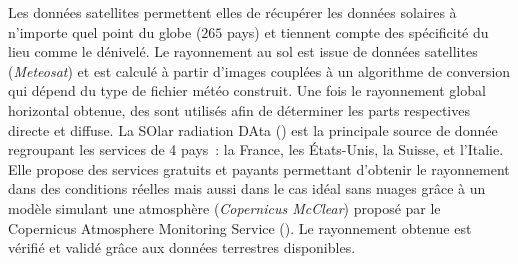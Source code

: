 Les données satellites permettent elles de récupérer les données solaires à n’importe quel
point du globe ($265$ pays) et tiennent compte des spécificité du lieu comme le dénivelé.
Le rayonnement au sol est issue de données satellites (\textit{Meteosat}) et est
calculé à partir d’images couplées à un algorithme de conversion qui dépend du type de
fichier météo construit. Une fois le rayonnement global horizontal obtenue, des
sont utilisés afin de déterminer les parts respectives directe et diffuse. La SOlar
radiation DAta () est la principale source de
donnée regroupant les services de 4 pays~: la France, les États-Unis, la Suisse, et
l’Italie. Elle propose des services gratuits et payants permettant d’obtenir le
rayonnement dans des conditions réelles mais aussi dans le cas idéal sans nuages grâce à
un modèle simulant une atmosphère (\textit{Copernicus McClear}) proposé par le
Copernicus Atmosphere Monitoring Service ().
Le rayonnement obtenue est vérifié et validé grâce aux données terrestres disponibles.

